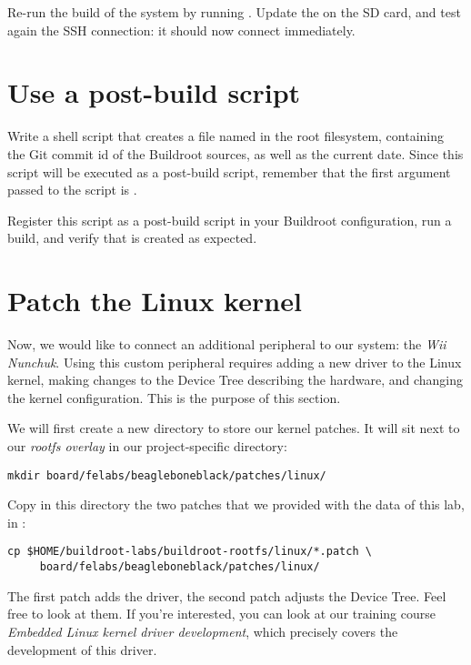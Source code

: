 Re-run the build of the system by running . Update the
 on the SD card, and test again the SSH connection: it
should now connect immediately.

\section{Use a post-build script}

Write a shell script that creates a file named  in
the root filesystem, containing the Git commit id of the Buildroot
sources, as well as the current date. Since this script will be
executed as a post-build script, remember that the first argument
passed to the script is .

Register this script as a post-build script in your Buildroot
configuration, run a build, and verify that  is
created as expected.

\section{Patch the Linux kernel}

Now, we would like to connect an additional peripheral to our system:
the {\em Wii Nunchuk}. Using this custom peripheral requires adding a
new driver to the Linux kernel, making changes to the Device Tree
describing the hardware, and changing the kernel configuration. This
is the purpose of this section.

We will first create a new directory to store our kernel patches. It
will sit next to our {\em rootfs overlay} in our project-specific
directory:

\begin{verbatim}
mkdir board/felabs/beagleboneblack/patches/linux/
\end{verbatim}

Copy in this directory the two patches that we provided with the data
of this lab, in :

\begin{verbatim}
cp $HOME/buildroot-labs/buildroot-rootfs/linux/*.patch \
     board/felabs/beagleboneblack/patches/linux/
\end{verbatim}

The first patch adds the driver, the second patch adjusts the Device
Tree. Feel free to look at them. If you're interested, you can look at
our training course {\em Embedded Linux kernel driver development},
which precisely covers the development of this driver.

